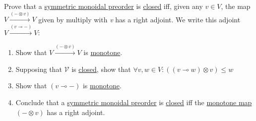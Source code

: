 Prove that a \href{doc/1 math/Seven Sketches in Compositionality/Chapter 2: Resource theories/2 Symmetric monoidal preorders/1 Definition and first examples/1 Symmetric monoidal structure on a preorder}{symmetric monoidal preorder} is \href{doc/1 math/Seven Sketches in Compositionality/Chapter 2: Resource theories/5 Computing presented V-categories with matrix mult/1 Monoidal closed preorders/1 Closed SMP}{closed} iff, given any $v \in V$, the map $V \xrightarrow{(-\otimes v)}V$ given by multiply with \emph{v} has a right adjoint.  We write this adjoint $V \xrightarrow{(v \multimap -)}V$:
\begin{enumerate}
  \item Show that $V \xrightarrow{(-\otimes v)}V$ is \href{doc/1 math/Seven Sketches in Compositionality/Chapter 1: Generative Effects/4 Monotone maps/1 Monotone map}{monotone}.
  \item Supposing that $\mathcal{V}$ is \href{doc/1 math/Seven Sketches in Compositionality/Chapter 2: Resource theories/5 Computing presented V-categories with matrix mult/1 Monoidal closed preorders/1 Closed SMP}{closed}, show that $\forall v,w \in V: ((v \multimap w)\otimes v) \leq w$
  \item Show that $(v \multimap -)$ is \href{doc/1 math/Seven Sketches in Compositionality/Chapter 1: Generative Effects/4 Monotone maps/1 Monotone map}{monotone}.
  \item Conclude that a \href{doc/1 math/Seven Sketches in Compositionality/Chapter 2: Resource theories/2 Symmetric monoidal preorders/1 Definition and first examples/1 Symmetric monoidal structure on a preorder}{symmetric monoidal preorder} is \href{doc/1 math/Seven Sketches in Compositionality/Chapter 2: Resource theories/5 Computing presented V-categories with matrix mult/1 Monoidal closed preorders/1 Closed SMP}{closed} iff the \href{doc/1 math/Seven Sketches in Compositionality/Chapter 1: Generative Effects/4 Monotone maps/1 Monotone map}{monotone map} $(- \otimes v)$ has a right adjoint.
\end{enumerate}